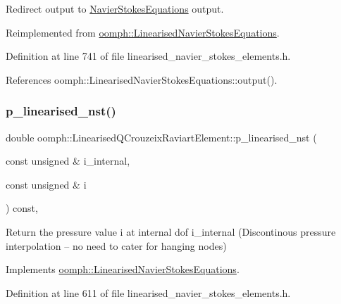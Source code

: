 Redirect output to \hyperlink{classoomph_1_1NavierStokesEquations}{Navier\+Stokes\+Equations} output. 



Reimplemented from \hyperlink{classoomph_1_1LinearisedNavierStokesEquations_a526bc349330e22ae332c75d0b9fd75df}{oomph\+::\+Linearised\+Navier\+Stokes\+Equations}.



Definition at line 741 of file linearised\+\_\+navier\+\_\+stokes\+\_\+elements.\+h.



References oomph\+::\+Linearised\+Navier\+Stokes\+Equations\+::output().

\mbox{\label{classoomph_1_1LinearisedQCrouzeixRaviartElement_a249f8ab0e96abdabb3f60488386ba55d}} 
\subsubsection{\texorpdfstring{p\+\_\+linearised\+\_\+nst()}{p\_linearised\_nst()}}
{\footnotesize\ttfamily double oomph\+::\+Linearised\+Q\+Crouzeix\+Raviart\+Element\+::p\+\_\+linearised\+\_\+nst (\begin{DoxyParamCaption}\item[{const unsigned \&}]{i\+\_\+internal,  }\item[{const unsigned \&}]{i }\end{DoxyParamCaption}) const\hspace{0.3cm}{\ttfamily [inline]}, {\ttfamily [virtual]}}



Return the pressure value i at internal dof i\+\_\+internal (Discontinous pressure interpolation -- no need to cater for hanging nodes) 



Implements \hyperlink{classoomph_1_1LinearisedNavierStokesEquations_a7c3449ddb70e11667cb8926db5ce1174}{oomph\+::\+Linearised\+Navier\+Stokes\+Equations}.



Definition at line 611 of file linearised\+\_\+navier\+\_\+stokes\+\_\+elements.\+h.



